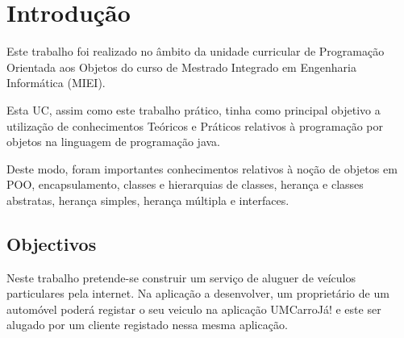 \documentclass[a4paper,11pt]{report}
\begin{document}


\tableofcontents
\clearpage



\chapter{Introdução}

\hspace{0.50cm} Este trabalho foi realizado no âmbito da unidade curricular de Programação Orientada aos Objetos do curso de Mestrado Integrado em Engenharia Informática (MIEI). \par

\vspace{0.5cm}

Esta UC, assim como este trabalho prático, tinha como principal objetivo a utilização de conhecimentos Teóricos e 
Práticos relativos à programação por objetos na linguagem de programação java. 

\vspace{0.5cm}

Deste modo, foram importantes conhecimentos relativos à noção de objetos em POO, encapsulamento, classes e hierarquias de classes, herança e classes abstratas, herança simples, herança múltipla e interfaces. \par

\section{Objectivos}

\hspace{0.50cm} Neste trabalho pretende-se construir um serviço de aluguer de veículos particulares pela internet.  Na aplicação a desenvolver, um proprietário de um automóvel poderá registar o seu veiculo na aplicação UMCarroJá! e este ser alugado por um cliente registado nessa mesma aplicação. \par 

\vspace{0.5cm}
\end{document}
